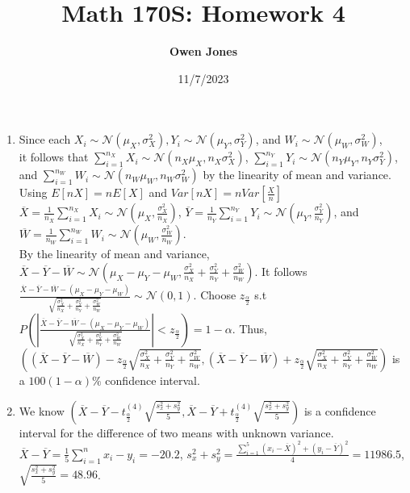 \documentclass[10pt]{article}
\title{\bf Math 170S: Homework 4}
\date{11/7/2023}
\author{\bf Owen Jones}
\begin{document}
\maketitle
\begin{enumerate}[label=\textbf{Problem \arabic*.}]
    \item Since each $X_i\sim\mathcal{N}(\mu_X,\sigma^2_X),Y_i\sim\mathcal{N}(\mu_Y,\sigma^2_Y)$, and $W_i\sim\mathcal{N}(\mu_W,\sigma^2_W)$,\\ 
    it follows that $\displaystyle \sum_{i=1}^{n_X}X_i\sim\mathcal{N}(n_X\mu_X,n_X\sigma^2_X)$, $\displaystyle \sum_{i=1}^{n_Y}Y_i\sim\mathcal{N}(n_Y\mu_Y,n_Y\sigma^2_Y)$, and $\displaystyle \sum_{i=1}^{n_W}W_i\sim\mathcal{N}(n_W\mu_W,n_W\sigma^2_W)$ by the linearity of mean and variance.\\
    Using $E[nX]=nE[X]$ and $Var[nX]=nVar[\frac{X}{n}]$ $\displaystyle \overline{X}=\frac{1}{n_X}\sum_{i=1}^{n_X}X_i\sim\mathcal{N}(\mu_X,\frac{\sigma^2_X}{n_X})$, $\displaystyle \overline{Y}=\frac{1}{n_Y}\sum_{i=1}^{n_Y}Y_i\sim\mathcal{N}(\mu_Y,\frac{\sigma^2_Y}{n_Y})$, and $\displaystyle \overline{W}=\frac{1}{n_W}\sum_{i=1}^{n_W}W_i\sim\mathcal{N}(\mu_W,\frac{\sigma^2_W}{n_W})$.\\
    By the linearity of mean and variance, $\overline{X}-\overline{Y}-\overline{W}\sim\mathcal{N}(\mu_X-\mu_Y-\mu_W,\frac{\sigma^2_X}{n_X}+\frac{\sigma^2_Y}{n_Y}+\frac{\sigma^2_W}{n_W})$.
    It follows $\frac{\overline{X}-\overline{Y}-\overline{W}-(\mu_X-\mu_Y-\mu_W)}{\sqrt{\frac{\sigma^2_X}{n_X}+\frac{\sigma^2_Y}{n_Y}+\frac{\sigma^2_W}{n_W}}}\sim\mathcal{N}(0,1)$. 
    Choose $z_\frac{\alpha}{2}$ s.t $P(|\frac{\overline{X}-\overline{Y}-\overline{W}-(\mu_X-\mu_Y-\mu_W)}{\sqrt{\frac{\sigma^2_X}{n_X}+\frac{\sigma^2_Y}{n_Y}+\frac{\sigma^2_W}{n_W}}}|<z_\frac{\alpha}{2})=1-\alpha$.
    Thus, $((\overline{X}-\overline{Y}-\overline{W})-z_\frac{\alpha}{2}\sqrt{\frac{\sigma^2_X}{n_X}+\frac{\sigma^2_Y}{n_Y}+\frac{\sigma^2_W}{n_W}},(\overline{X}-\overline{Y}-\overline{W})+z_\frac{\alpha}{2}\sqrt{\frac{\sigma^2_X}{n_X}+\frac{\sigma^2_Y}{n_Y}+\frac{\sigma^2_W}{n_W}})$ is a $100(1-\alpha)\%$ confidence interval.
    \item We know $(\overline{X}-\overline{Y}-t^{(4)}_\frac{\alpha}{2}\sqrt{\frac{s^2_x+s^2_y}{5}},\overline{X}-\overline{Y}+t^{(4)}_\frac{\alpha}{2}\sqrt{\frac{s^2_x+s^2_y}{5}})$ is a confidence interval for the difference of two means with unknown variance. 
    $\displaystyle\overline{X}-\overline{Y}=\frac{1}{5}\sum_{i=1}^{n}x_i-y_i=-20.2$, $s^2_x+s^2_y=\frac{\displaystyle\sum_{i=1}^{5}{(x_i-\overline{X})}^2+{(y_i-\overline{Y})}^2}{4}=11986.5$, $\sqrt{\frac{s^2_x+s^2_y}{5}}=48.96$.

\end{enumerate}
\end{document}
